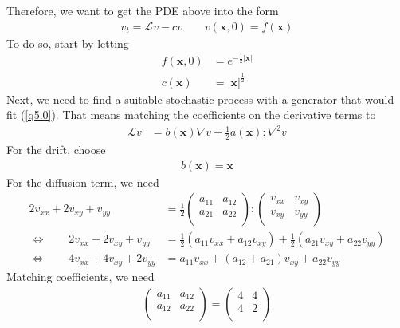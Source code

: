 \documentclass[12pt]{article}
\theoremstyle{plain}
\theoremstyle{definition}
\theoremstyle{remark}
\begin{document}
\begin{enumerate}
    Therefore, we want to get the PDE above into the form
    \begin{align}
      \label{q5.0}
      v_t = \mathscr{L}v - cv
      \qquad v(\mathbf{x},0) = f(\mathbf{x})
    \end{align}
    To do so, start by letting
    \begin{align*}
      f(\mathbf{x},0) &= e^{-\frac{1}{2}|\mathbf{x}|} \\
      c(\mathbf{x}) &= |\mathbf{x}|^{\frac{1}{2}}
    \end{align*}
    Next, we need to find a suitable stochastic process with a generator
    that would fit (\ref{q5.0}). That means matching the coefficients on
    the derivative terms to
    \begin{align*}
      \mathscr{L}v
      &=
      b(\mathbf{x}) \nabla v
      + \frac{1}{2} a(\mathbf{x}) : \nabla^2 v
    \end{align*}
    For the drift, choose
    \begin{align*}
      b(\mathbf{x}) = \mathbf{x}
    \end{align*}
    For the diffusion term, we need
    \begin{align*}
      2v_{xx} + 2v_{xy} + v_{yy}
      &=
        \frac{1}{2}
        \begin{pmatrix}
          a_{11} & a_{12} \\
          a_{21} & a_{22} \\
        \end{pmatrix}
        :
        \begin{pmatrix}
          v_{xx} & v_{xy} \\
          v_{xy} & v_{yy} \\
        \end{pmatrix}\\
      \Leftrightarrow\qquad
      2v_{xx} + 2v_{xy} + v_{yy}
      &= \frac{1}{2}
      (a_{11} v_{xx}
      + a_{12}v_{xy})
      +\frac{1}{2}
      (a_{21} v_{xy}
      + a_{22}v_{yy})\\
      \Leftrightarrow\qquad
      4v_{xx} + 4v_{xy} + 2v_{yy}
      &=
      a_{11} v_{xx}
      + (a_{12}+a_{21})v_{xy}
      + a_{22}v_{yy}
    \end{align*}
    Matching coefficients, we need
    \begin{align*}
      \begin{pmatrix}
        a_{11} & a_{12} \\
        a_{12} & a_{22} \\
      \end{pmatrix}
      =
      \begin{pmatrix}
        4 & 4 \\
        4 & 2 \\
      \end{pmatrix}
    \end{align*}


\end{enumerate}
\end{document}
